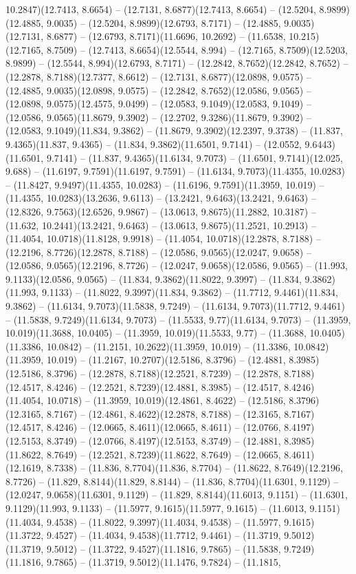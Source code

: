 10.2847)(12.7413, 8.6654) -- (12.7131, 8.6877)(12.7413, 8.6654) -- (12.5204, 8.9899)(12.4885, 9.0035) -- (12.5204, 8.9899)(12.6793, 8.7171) -- (12.4885, 9.0035)(12.7131, 8.6877) -- (12.6793, 8.7171)(11.6696, 10.2692) -- (11.6538, 10.215)(12.7165, 8.7509) -- (12.7413, 8.6654)(12.5544, 8.994) -- (12.7165, 8.7509)(12.5203, 8.9899) -- (12.5544, 8.994)(12.6793, 8.7171) -- (12.2842, 8.7652)(12.2842, 8.7652) -- (12.2878, 8.7188)(12.7377, 8.6612) -- (12.7131, 8.6877)(12.0898, 9.0575) -- (12.4885, 9.0035)(12.0898, 9.0575) -- (12.2842, 8.7652)(12.0586, 9.0565) -- (12.0898, 9.0575)(12.4575, 9.0499) -- (12.0583, 9.1049)(12.0583, 9.1049) -- (12.0586, 9.0565)(11.8679, 9.3902) -- (12.2702, 9.3286)(11.8679, 9.3902) -- (12.0583, 9.1049)(11.834, 9.3862) -- (11.8679, 9.3902)(12.2397, 9.3738) -- (11.837, 9.4365)(11.837, 9.4365) -- (11.834, 9.3862)(11.6501, 9.7141) -- (12.0552, 9.6443)(11.6501, 9.7141) -- (11.837, 9.4365)(11.6134, 9.7073) -- (11.6501, 9.7141)(12.025, 9.688) -- (11.6197, 9.7591)(11.6197, 9.7591) -- (11.6134, 9.7073)(11.4355, 10.0283) -- (11.8427, 9.9497)(11.4355, 10.0283) -- (11.6196, 9.7591)(11.3959, 10.019) -- (11.4355, 10.0283)(13.2636, 9.6113) -- (13.2421, 9.6463)(13.2421, 9.6463) -- (12.8326, 9.7563)(12.6526, 9.9867) -- (13.0613, 9.8675)(11.2882, 10.3187) -- (11.632, 10.2441)(13.2421, 9.6463) -- (13.0613, 9.8675)(11.2521, 10.2913) -- (11.4054, 10.0718)(11.8128, 9.9918) -- (11.4054, 10.0718)(12.2878, 8.7188) -- (12.2196, 8.7726)(12.2878, 8.7188) -- (12.0586, 9.0565)(12.0247, 9.0658) -- (12.0586, 9.0565)(12.2196, 8.7726) -- (12.0247, 9.0658)(12.0586, 9.0565) -- (11.993, 9.1133)(12.0586, 9.0565) -- (11.834, 9.3862)(11.8022, 9.3997) -- (11.834, 9.3862)(11.993, 9.1133) -- (11.8022, 9.3997)(11.834, 9.3862) -- (11.7712, 9.4461)(11.834, 9.3862) -- (11.6134, 9.7073)(11.5838, 9.7249) -- (11.6134, 9.7073)(11.7712, 9.4461) -- (11.5838, 9.7249)(11.6134, 9.7073) -- (11.5533, 9.77)(11.6134, 9.7073) -- (11.3959, 10.019)(11.3688, 10.0405) -- (11.3959, 10.019)(11.5533, 9.77) -- (11.3688, 10.0405)(11.3386, 10.0842) -- (11.2151, 10.2622)(11.3959, 10.019) -- (11.3386, 10.0842)(11.3959, 10.019) -- (11.2167, 10.2707)(12.5186, 8.3796) -- (12.4881, 8.3985)(12.5186, 8.3796) -- (12.2878, 8.7188)(12.2521, 8.7239) -- (12.2878, 8.7188)(12.4517, 8.4246) -- (12.2521, 8.7239)(12.4881, 8.3985) -- (12.4517, 8.4246)(11.4054, 10.0718) -- (11.3959, 10.019)(12.4861, 8.4622) -- (12.5186, 8.3796)(12.3165, 8.7167) -- (12.4861, 8.4622)(12.2878, 8.7188) -- (12.3165, 8.7167)(12.4517, 8.4246) -- (12.0665, 8.4611)(12.0665, 8.4611) -- (12.0766, 8.4197)(12.5153, 8.3749) -- (12.0766, 8.4197)(12.5153, 8.3749) -- (12.4881, 8.3985)(11.8622, 8.7649) -- (12.2521, 8.7239)(11.8622, 8.7649) -- (12.0665, 8.4611)(12.1619, 8.7338) -- (11.836, 8.7704)(11.836, 8.7704) -- (11.8622, 8.7649)(12.2196, 8.7726) -- (11.829, 8.8144)(11.829, 8.8144) -- (11.836, 8.7704)(11.6301, 9.1129) -- (12.0247, 9.0658)(11.6301, 9.1129) -- (11.829, 8.8144)(11.6013, 9.1151) -- (11.6301, 9.1129)(11.993, 9.1133) -- (11.5977, 9.1615)(11.5977, 9.1615) -- (11.6013, 9.1151)(11.4034, 9.4538) -- (11.8022, 9.3997)(11.4034, 9.4538) -- (11.5977, 9.1615)(11.3722, 9.4527) -- (11.4034, 9.4538)(11.7712, 9.4461) -- (11.3719, 9.5012)(11.3719, 9.5012) -- (11.3722, 9.4527)(11.1816, 9.7865) -- (11.5838, 9.7249)(11.1816, 9.7865) -- (11.3719, 9.5012)(11.1476, 9.7824) -- (11.1815, 